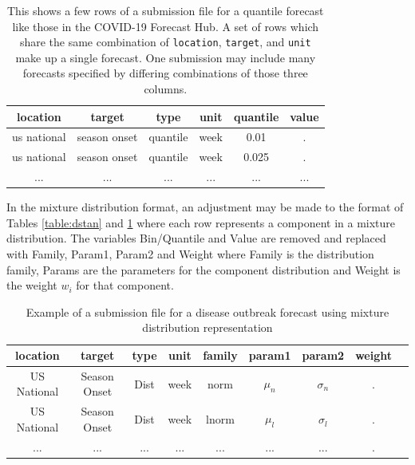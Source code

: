 \documentclass[11pt,notitlepage]{isuthesis}
\begin{document}
\begin{table}[h!]
\begin{center}
\begin{minipage}{11cm}
\captionsetup{font=scriptsize}
\centering
 \begin{tabular}{|c|c|c|c|c|c|}
 \hline
    location & target & type & unit & quantile & value  \\ \hline
    us national & season onset & quantile & week & 0.01 & . \\
    us national & season onset & quantile & week & 0.025 & . \\
    ... & ... & ... & ... & ... & ... \\
 \hline
 \end{tabular}
 \caption[COVID-19 Forecast Hub competition submission example]{This shows
 a few rows of a 
 submission file
 for a quantile forecast like those in the COVID-19 Forecast Hub. 
 A set of rows which share the same combination of 
 \texttt{location}, \texttt{target}, and \texttt{unit} make up a
 single forecast. One submission may include many forecasts specified by 
 differing combinations of those three columns.}
 \label{table:qstan}
 \end{minipage}
 \end{center}
\end{table}



In the mixture distribution format, an adjustment may be made to the format of 
Tables
\ref{table:dstan} and \ref{table:qstan} where each 
row
represents a component in a mixture distribution.
The variables Bin/Quantile and Value are removed and replaced with Family,
Param1, Param2 and Weight where Family is the distribution family,
Params are the parameters for the component distribution and Weight is the 
weight $w_i$ for that component.

\begin{table}[h!]
\centering
 \begin{tabular}{|c|c|c|c|c|c|c|c|c|}
 \hline
    location & target & type & unit & family & param1 & param2 & weight
    \\ \hline
    US National & Season Onset & Dist & week & norm & $\mu_n$ & $\sigma_n$ & .\\
    US National & Season Onset & Dist & week & lnorm & $\mu_l$ & $\sigma_l$ &.\\
    ... & ... & ... & ... & ... & ... & ... & .\\
 \hline
 \end{tabular}
 \caption[Mixture distribution forecast submission example]{Example of a 
 submission file
 for a disease outbreak forecast using mixture distribution representation}
 \label{table:mstan}
\end{table}
\end{document}
